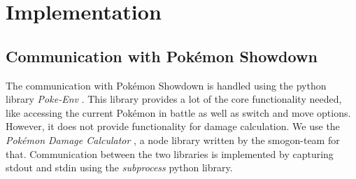 \section{Implementation}
\subsection{Communication with Pokémon Showdown}
\label{sec:poke-env}
The communication with Pokémon Showdown is handled using the python library \textit{Poke-Env} \cite{PokeEnv:Github}.
This library provides a lot of the core functionality needed, like accessing the current Pokémon in battle as well
as switch and move options. However, it does not provide functionality for damage calculation. We use the \textit{Pokémon
Damage Calculator} \cite{Smogon:DamageCalc}, a node library written by the smogon-team for that. 
Communication between the two libraries is implemented by capturing stdout and stdin using the \textit{subprocess} python library.

